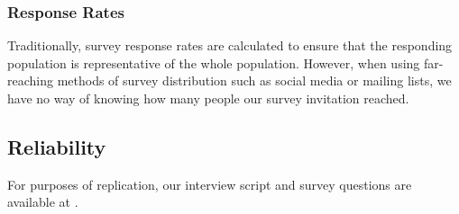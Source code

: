 \subsubsection{Response Rates}
Traditionally, survey response rates are calculated to ensure that the responding population is representative of the whole population. However, when using far-reaching methods of survey distribution such as social media or mailing lists, we have no way of knowing how many people our survey invitation reached.

\subsection{Reliability}
For purposes of replication, our interview script and survey questions are available at \cite{companion_site}. 
